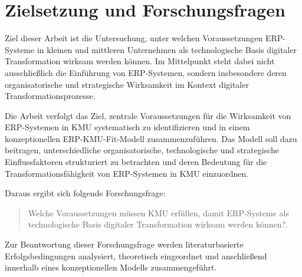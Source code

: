 \section{Zielsetzung und Forschungsfragen}

Ziel dieser Arbeit ist die Untersuchung, unter welchen Voraussetzungen ERP-Systeme in kleinen und mittleren Unternehmen als technologische 
Basis digitaler Transformation wirksam werden können. Im Mittelpunkt steht dabei nicht ausschließlich die Einführung von ERP-Systemen, 
sondern insbesondere deren organisatorische und strategische Wirksamkeit im Kontext digitaler Transformationsprozesse.

Die Arbeit verfolgt das Ziel, zentrale Voraussetzungen für die Wirksamkeit von ERP-Systemen in KMU systematisch 
zu identifizieren und in einem konzeptionellen ERP-KMU-Fit-Modell zusammenzuführen. Das Modell soll dazu beitragen, unterschiedliche 
organisatorische, technologische und strategische Einflussfaktoren strukturiert zu betrachten und deren Bedeutung für die 
Transformationsfähigkeit von ERP-Systemen in KMU einzuordnen.

\noindent Daraus ergibt sich folgende Forschungsfrage:

\begin{quote}
\glqq Welche Voraussetzungen müssen KMU erfüllen, damit ERP-Systeme als technologische Basis digitaler Transformation wirksam werden können?\grqq{}.
\end{quote}

\noindent Zur Beantwortung dieser Forschungsfrage werden literaturbasierte Erfolgsbedingungen analysiert, theoretisch eingeordnet und anschließend 
innerhalb eines konzeptionellen Modells zusammengeführt.